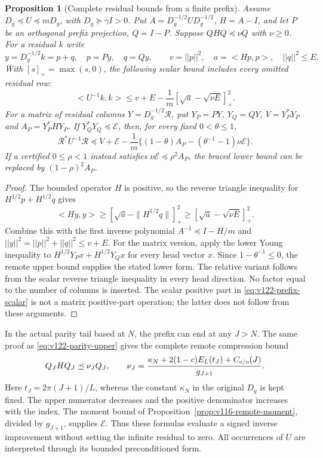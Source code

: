 \documentclass[11pt]{article}
\def\norm#1{||#1||}%
\def\ip#1#2{<#1,#2>}%
\newtheorem{proposition}[theorem]{Proposition}
\theoremstyle{remark}
\newcommand{\norm}[1]{\left\lVert #1\right\rVert}
\newcommand{\ip}[2]{\left\langle #1,#2\right\rangle}
\begin{document}
\begin{proposition}[Complete residual bounds from a finite prefix]
\label{prop:v122-prefix-refinement}
Assume $D_g\preceq U\preceq mD_g$, with
$D_g\succeq\gamma I>0$. Put
$A=D_g^{-1/2}UD_g^{-1/2}$, $H=A-I$, and let $P$ be an
orthogonal prefix projection, $Q=I-P$. Suppose
$QHQ\preceq\nu Q$ with $\nu\ge0$. For a residual $k$ write
\[
 y=D_g^{-1/2}k=p+q,\quad p=Py,\quad q=Qy,\qquad
 v=\norm p^2,\quad a=\ip{Hp}{p},\quad \norm q^2\le E.
\]
With $[s]_+=\max(s,0)$, the following scalar bound includes
every omitted residual row:
\begin{equation}\label{eq:v122-prefix-scalar}
 \ip{U^{-1}k}{k}
 \le v+E-\frac1m[\sqrt a-\sqrt{\nu E}]_+^2.
\end{equation}
For a matrix of residual columns $Y=D_g^{-1/2}\mathcal R$, put
$Y_P=PY$, $Y_Q=QY$, $V=Y_P^*Y_P$ and
$A_P=Y_P^*HY_P$. If $Y_Q^*Y_Q\preceq\mathcal E$, then, for
every fixed $0<\theta\le1$,
\begin{equation}\label{eq:v122-prefix-matrix}
 \mathcal R^*U^{-1}\mathcal R\preceq
 V+\mathcal E-\frac1m
 \{(1-\theta)A_P-(\theta^{-1}-1)\nu\mathcal E\}.
\end{equation}
If a certified $0\le\rho<1$ instead satisfies
$\nu\mathcal E\preceq\rho^2A_P$, the braced lower bound can
be replaced by $(1-\rho)^2A_P$.
\end{proposition}
\begin{proof}
The bounded operator $H$ is positive, so the reverse triangle
inequality for $H^{1/2}p+H^{1/2}q$ gives
\[
 \ip{Hy}{y}\ge
 [\sqrt a-\|H^{1/2}q\|]_+^2
 \ge[\sqrt a-\sqrt{\nu E}]_+^2.
\]
Combine this with the first inverse polynomial
$A^{-1}\preceq I-H/m$ and
$\norm y^2=\norm p^2+\norm q^2\le v+E$.
For the matrix version, apply the lower Young inequality to
$H^{1/2}Y_Px+H^{1/2}Y_Qx$ for every head vector $x$.
Since $1-\theta^{-1}\le0$, the remote upper bound supplies the
stated lower form. The relative variant follows from the scalar
reverse triangle inequality in every head direction. No factor
equal to the number of columns is inserted. The scalar positive
part in \eqref{eq:v122-prefix-scalar} is not a matrix positive-part
operation; the latter does not follow from these arguments.
\end{proof}

In the actual parity tail based at $N$, the prefix can end at any
$J>N$. The same proof as \eqref{eq:v122-parity-upper} gives the
complete remote compression bound
\begin{equation}\label{eq:v122-remote-H}
 Q_JHQ_J\preceq\nu_J Q_J,\qquad
 \nu_J=\frac{\kappa_N+2(1-c)E_L(t_J)+C_{\rm e/o}(J)}{g_{J+1}}.
\end{equation}
Here $t_J=2\pi(J+1)/L$, whereas the constant $\kappa_N$ in
the original $D_g$ is kept fixed. The upper numerator decreases
and the positive denominator increases with the index. The moment
bound of Proposition~\ref{prop:v116-remote-moment}, divided by
$g_{J+1}$, supplies $\mathcal E$. Thus these formulas evaluate a
signed inverse improvement without setting the infinite residual
to zero. All occurrences of $U$ are interpreted through its
bounded preconditioned form.
\end{document}
